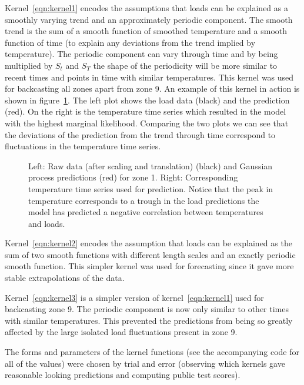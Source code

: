 \documentclass[preprint,authoryear,12pt]{elsarticle}
\begin{document}
Kernel~\eqref{eqn:kernel1} encodes the assumptions that loads can be explained as a smoothly varying trend and an approximately periodic component.
The smooth trend is the sum of a smooth function of smoothed temperature and a smooth function of time (to explain any deviations from the trend implied by temperature).
The periodic component can vary through time and by being multiplied by $S_t$ and $S_T$ the shape of the periodicity will be more similar to recent times and points in time with similar temperatures.
This kernel was used for backcasting all zones apart from zone 9.
An example of this kernel in action is shown in figure~\ref{fig:load_pred}.
The left plot shows the load data (black) and the prediction (red).
On the right is the temperature time series which resulted in the model with the highest marginal likelihood.
Comparing the two plots we can see that the deviations of the prediction from the trend through time correspond to fluctuations in the temperature time series.

\begin{figure}[ht]
  \begin{center}
    
  \end{center}
  \caption{Left: Raw data (after scaling and translation) (black) and Gaussian process predictions (red) for zone 1. Right: Corresponding temperature time series used for prediction. Notice that the peak in temperature corresponds to a trough in the load predictions \ie the model has predicted a negative correlation between temperatures and loads.}
  \label{fig:load_pred}
\end{figure}

Kernel~\eqref{eqn:kernel2} encodes the assumption that loads can be explained as the sum of two smooth functions with different length scales and an exactly periodic smooth function.
This simpler kernel was used for forecasting since it gave more stable extrapolations of the data.

Kernel~\eqref{eqn:kernel3} is a simpler version of kernel~\eqref{eqn:kernel1} used for backcasting zone 9.
The periodic component is now only similar to other times with similar temperatures.
This prevented the predictions from being so greatly affected by the large isolated load fluctuations present in zone 9.

The forms and parameters of the kernel functions (see the accompanying code for all of the values) were chosen by trial and error (observing which kernels gave reasonable looking predictions and computing public test scores).
\end{document}

